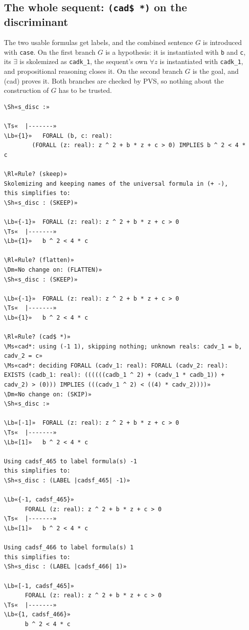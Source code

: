 \documentclass[11pt]{article}
\newcommand\Rl[1]{\textcolor{accent}{\textbf{#1}}}
\newcommand\Ms[1]{\textcolor{moss}{\textbf{#1}}}
\newcommand\Dm[1]{\textcolor{muted}{#1}}
\newcommand\Lb[1]{\textcolor{muted}{#1}}
\newcommand\Ts[1]{\textcolor{muted}{#1}}
\newcommand\Sh[1]{\textcolor{accent}{#1}}
\begin{document}
\subsection*{The whole sequent: \texttt{(cad\$ *)} on the discriminant}
The two usable formulas get labels, and the combined sentence $G$ is introduced with \texttt{case}. On the first branch $G$ is a
hypothesis: it is instantiated with \texttt{b} and \texttt{c}, its $\exists$ is skolemized as \texttt{cadk\_1}, the sequent's own
$\forall z$ is instantiated with \texttt{cadk\_1}, and propositional reasoning closes it. On the second branch $G$ is the goal, and
(cad) proves it. Both branches are checked by PVS, so nothing about the construction of $G$ has to be trusted.
\begin{termbox}
\begin{Verbatim}[commandchars=\\«»]
\Sh«s_disc :»

\Ts«  |-------»
\Lb«{1}»   FORALL (b, c: real):
        (FORALL (z: real): z ^ 2 + b * z + c > 0) IMPLIES b ^ 2 < 4 * c

\Rl«Rule? (skeep)»
Skolemizing and keeping names of the universal formula in (+ -),
this simplifies to:
\Sh«s_disc : (SKEEP)»

\Lb«{-1}»  FORALL (z: real): z ^ 2 + b * z + c > 0
\Ts«  |-------»
\Lb«{1}»   b ^ 2 < 4 * c

\Rl«Rule? (flatten)»
\Dm«No change on: (FLATTEN)»
\Sh«s_disc : (SKEEP)»

\Lb«{-1}»  FORALL (z: real): z ^ 2 + b * z + c > 0
\Ts«  |-------»
\Lb«{1}»   b ^ 2 < 4 * c

\Rl«Rule? (cad$ *)»
\Ms«cad*: using (-1 1), skipping nothing; unknown reals: cadv_1 = b, cadv_2 = c»
\Ms«cad*: deciding FORALL (cadv_1: real): FORALL (cadv_2: real): EXISTS (cadb_1: real): ((((((cadb_1 ^ 2) + (cadv_1 * cadb_1)) + cadv_2) > (0))) IMPLIES (((cadv_1 ^ 2) < ((4) * cadv_2))))»
\Dm«No change on: (SKIP)»
\Sh«s_disc :»

\Lb«[-1]»  FORALL (z: real): z ^ 2 + b * z + c > 0
\Ts«  |-------»
\Lb«[1]»   b ^ 2 < 4 * c

Using cadsf_465 to label formula(s) -1
this simplifies to:
\Sh«s_disc : (LABEL |cadsf_465| -1)»

\Lb«{-1, cadsf_465}»
      FORALL (z: real): z ^ 2 + b * z + c > 0
\Ts«  |-------»
\Lb«[1]»   b ^ 2 < 4 * c

Using cadsf_466 to label formula(s) 1
this simplifies to:
\Sh«s_disc : (LABEL |cadsf_466| 1)»

\Lb«[-1, cadsf_465]»
      FORALL (z: real): z ^ 2 + b * z + c > 0
\Ts«  |-------»
\Lb«{1, cadsf_466}»
      b ^ 2 < 4 * c


\end{Verbatim}
\end{termbox}
\end{document}

